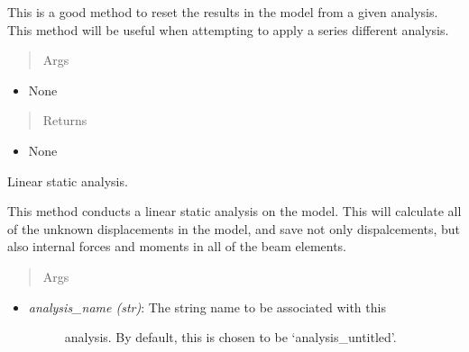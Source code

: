 \documentclass[letterpaper,10pt,english]{sphinxmanual}
\begin{document}
\begin{fulllineitems}
\begin{fulllineitems}
This is a good method to reset the results in the model from a given
analysis. This method will be useful when attempting to apply a series
different analysis.
\begin{quote}\begin{description}
\item[{Args}] \leavevmode
\end{description}\end{quote}
\begin{itemize}
\item {} 
None

\end{itemize}
\begin{quote}\begin{description}
\item[{Returns}] \leavevmode
\end{description}\end{quote}
\begin{itemize}
\item {} 
None

\end{itemize}

\end{fulllineitems}


\begin{fulllineitems}
\label{FEM:AeroComBAT.FEM.Model.staticAnalysis}
Linear static analysis.

This method conducts a linear static analysis on the model. This will
calculate all of the unknown displacements in the model, and save not
only dispalcements, but also internal forces and moments in all of the
beam elements.
\begin{quote}\begin{description}
\item[{Args}] \leavevmode
\end{description}\end{quote}
\begin{itemize}
\item {} \begin{description}
\item[{\emph{analysis\_name (str)}: The string name to be associated with this}] \leavevmode
analysis. By default, this is chosen to be `analysis\_untitled'.

\end{description}


\end{itemize}
\end{fulllineitems}
\end{fulllineitems}
\end{document}
